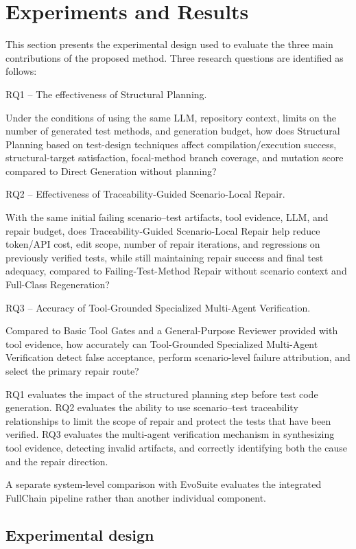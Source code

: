 \documentclass[pdflatex,sn-basic,Numbered,iicol]{sn-jnl}
\begin{document}
\section{Experiments and Results}\label{sec:experiments}

This section presents the experimental design used to evaluate the three main contributions of the proposed method. Three research questions are identified as follows:

RQ1 -- The effectiveness of Structural Planning.

Under the conditions of using the same LLM, repository context, limits on the number of generated test methods, and generation budget, how does Structural Planning based on test-design techniques affect compilation/execution success, structural-target satisfaction, focal-method branch coverage, and mutation score compared to Direct Generation without planning?

RQ2 -- Effectiveness of Traceability-Guided Scenario-Local Repair.

With the same initial failing scenario--test artifacts, tool evidence, LLM, and repair budget, does Traceability-Guided Scenario-Local Repair help reduce token/API cost, edit scope, number of repair iterations, and regressions on previously verified tests, while still maintaining repair success and final test adequacy, compared to Failing-Test-Method Repair without scenario context and Full-Class Regeneration?

RQ3 -- Accuracy of Tool-Grounded Specialized Multi-Agent Verification.

Compared to Basic Tool Gates and a General-Purpose Reviewer provided with tool evidence, how accurately can Tool-Grounded Specialized Multi-Agent Verification detect false acceptance, perform scenario-level failure attribution, and select the primary repair route?

RQ1 evaluates the impact of the structured planning step before test code generation. RQ2 evaluates the ability to use scenario--test traceability relationships to limit the scope of repair and protect the tests that have been verified. RQ3 evaluates the multi-agent verification mechanism in synthesizing tool evidence, detecting invalid artifacts, and correctly identifying both the cause and the repair direction.

A separate system-level comparison with EvoSuite evaluates the integrated FullChain pipeline rather than another individual component.

\subsection{Experimental design}\label{subsec:experimental-design}
\end{document}
